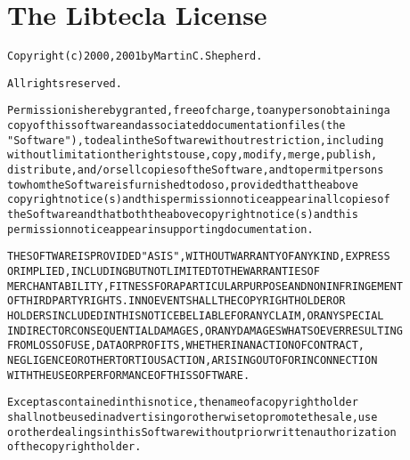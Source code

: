 \section*{The Libtecla License}
\vspace{-0.3in}
\begin{alltt}
\small\noindent
Copyright (c) 2000, 2001 by Martin C. Shepherd.

All rights reserved.

Permission is hereby granted, free of charge, to any person obtaining a
copy of this software and associated documentation files (the
"Software"), to deal in the Software without restriction, including
without limitation the rights to use, copy, modify, merge, publish,
distribute, and/or sell copies of the Software, and to permit persons
to whom the Software is furnished to do so, provided that the above
copyright notice(s) and this permission notice appear in all copies of
the Software and that both the above copyright notice(s) and this
permission notice appear in supporting documentation.

THE SOFTWARE IS PROVIDED "AS IS", WITHOUT WARRANTY OF ANY KIND, EXPRESS
OR IMPLIED, INCLUDING BUT NOT LIMITED TO THE WARRANTIES OF
MERCHANTABILITY, FITNESS FOR A PARTICULAR PURPOSE AND NONINFRINGEMENT
OF THIRD PARTY RIGHTS. IN NO EVENT SHALL THE COPYRIGHT HOLDER OR
HOLDERS INCLUDED IN THIS NOTICE BE LIABLE FOR ANY CLAIM, OR ANY SPECIAL
INDIRECT OR CONSEQUENTIAL DAMAGES, OR ANY DAMAGES WHATSOEVER RESULTING
FROM LOSS OF USE, DATA OR PROFITS, WHETHER IN AN ACTION OF CONTRACT,
NEGLIGENCE OR OTHER TORTIOUS ACTION, ARISING OUT OF OR IN CONNECTION
WITH THE USE OR PERFORMANCE OF THIS SOFTWARE.

Except as contained in this notice, the name of a copyright holder
shall not be used in advertising or otherwise to promote the sale, use
or other dealings in this Software without prior written authorization
of the copyright holder.
\end{alltt}
